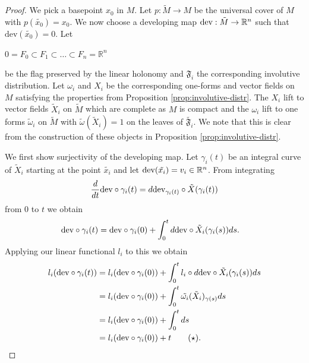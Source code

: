 \begin{proof}
    We pick a basepoint $x_0$ in $M$. Let $p: \tilde{M} \to M$ be the universal cover of $M$ with $p(\tilde{x_0}) = x_0$.
    We now choose a developing map $\text{dev}: \tilde{M} \to \mathbb{R}^n$ such that $\text{dev}(\tilde{x_0}) = 0$. Let
    \begin{center}
        $0 = F_0 \subset F_1 \subset \dots \subset F_n = \mathbb{R}^n$
    \end{center}
    be the flag preserved by the linear holonomy and $\mathfrak{F}_i$ the corresponding involutive distribution. Let $\omega_i$ and
    $X_i$ be the corresponding one-forms and vector fields on $M$ satisfying the properties from Proposition \ref{prop:involutive-distr}. The $X_i$ lift to vector fields
    $\tilde{X}_i$ on $\tilde{M}$ which are complete as $M$ is compact and the $\omega_i$ lift to one forms $\tilde{\omega}_i$ on $\tilde{M}$ with $\tilde{\omega}(\tilde{X}_i) = 1$ on the leaves of
    $\tilde{\mathfrak{F}_i}$. We note that this is clear from the construction of these objects in Proposition \ref{prop:involutive-distr}.

    We first show surjectivity of the developing map. Let $\gamma_i(t)$ be an
    integral curve of $\tilde{X}_i$ starting at the point $\tilde{x_i}$ and let
    $\text{dev}(\tilde{x_i}) = v_i \in \mathbb{R}^n$. From integrating $$
        \dfrac{d}{dt}\text{dev}\circ \gamma_i(t) = d\text{dev}_{\gamma_i(t)} \circ
        \tilde{X}(\gamma_i(t)) $$ from $0$ to $t$ we obtain
    \begin{align*}
        \text{dev}\circ \gamma_i(t) & = \text{dev}\circ \gamma_i(0) + \int_{0}^{t}d\text{dev} \circ \tilde{X}_i(\gamma_i(s))ds.
    \end{align*}
    Applying our linear functional $l_i$ to this we obtain
    \begin{align*}
        l_i(\text{dev}\circ \gamma_i(t)) & = l_i(\text{dev}\circ \gamma_i(0)) + \int_{0}^{t}l_i \circ d\text{dev} \circ \tilde{X}_i(\gamma_i(s))ds \\
                                         & = l_i(\text{dev}\circ \gamma_i(0)) + \int_{0}^{t}\tilde{\omega_i}(\tilde{X}_i)_{\gamma(s)}ds      \\
                                         & = l_i(\text{dev}\circ \gamma_i(0)) + \int_{0}^{t}ds                                               \\
                                         & = l_i(\text{dev}\circ \gamma_i(0)) + t \tag{$\star$}. \label{eq:flow}                             \\
    \end{align*}


\end{proof}

